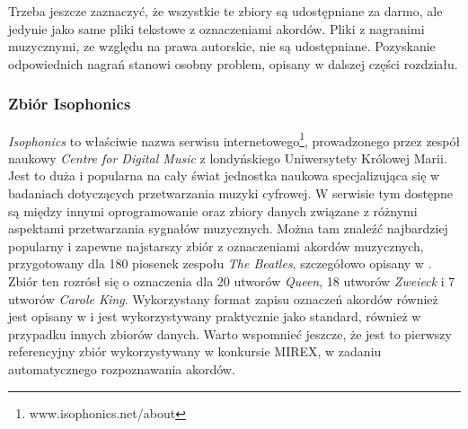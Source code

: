 \begin{table}
    \centering
    \caption{Fragment indeksu zbioru danych po pierwszym etapie jego tworzenia}
    \label{tab:indeks_01}
\end{table}

Trzeba jeszcze zaznaczyć, że wszystkie te zbiory są udostępniane za darmo, ale jedynie jako same
pliki tekstowe z oznaczeniami akordów. Pliki z nagranimi muzycznymi, ze względu na prawa autorskie,
nie są udostępniane. Pozyskanie odpowiednich nagrań stanowi osobny problem, opisany w dalszej części
rozdziału.

\subsubsection{Zbiór Isophonics}

\emph{Isophonics} to właściwie nazwa serwisu internetowego\footnote{www.isophonics.net/about},
prowadzonego przez zespół naukowy \emph{Centre for Digital Music} z londyńskiego Uniwersytety
Królowej Marii. Jest to duża i popularna na cały świat jednostka naukowa specjalizująca się w
badaniach dotyczących przetwarzania muzyki cyfrowej. W serwisie tym dostępne są między innymi
oprogramowanie oraz zbiory danych związane z różnymi aspektami przetwarzania sygnałów muzycznych.
Można tam znaleźć najbardziej popularny i zapewne najstarszy zbiór z oznaczeniami akordów
muzycznych, przygotowany dla 180 piosenek zespołu \emph{The Beatles}, szczegółowo opisany w
\cite{harte_towards_nodate}. Zbiór ten rozrósł się o oznaczenia dla 20 utworów \emph{Queen}, 18
utworów \emph{Zweieck} i 7 utworów \emph{Carole King}. Wykorzystany format zapisu oznaczeń akordów
również jest opisany w \cite{harte_towards_nodate} i jest wykorzystywany praktycznie jako standard,
również w przypadku innych zbiorów danych. Warto wspomnieć jeszcze, że jest to pierwszy referencyjny
zbiór wykorzystywany w konkursie MIREX, w zadaniu automatycznego rozpoznawania akordów.

